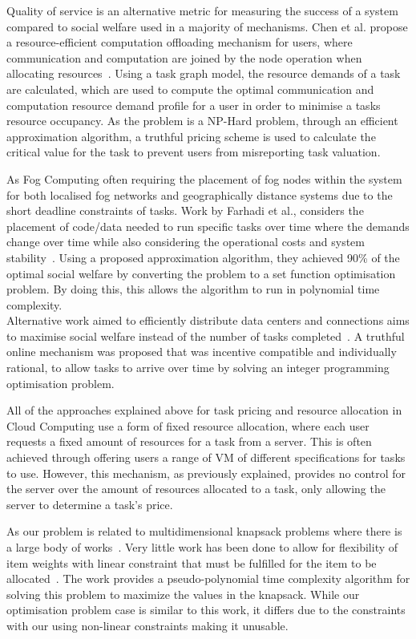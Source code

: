 Quality of service is an alternative metric for measuring the success of a system compared to social welfare used in a
majority of mechanisms. Chen et al. propose a resource-efficient computation offloading mechanism for users, where
communication and computation are joined by the node operation when allocating resources~\cite{8379445}. Using a task
graph model, the resource demands of a task are calculated, which are used to compute the optimal communication and
computation resource demand profile for a user in order to minimise a tasks resource occupancy. As the problem is a
NP-Hard problem, through an efficient approximation algorithm, a truthful pricing scheme is used to calculate the
critical value for the task to prevent users from misreporting task valuation.

As Fog Computing often requiring the placement of fog nodes within the system for both localised fog networks and
geographically distance systems due to the short deadline constraints of tasks. Work by Farhadi et al., considers
the placement of code/data needed to run specific tasks over time where the demands change over time while also
considering the operational costs and system stability~\cite{vaji_infocom}. Using a proposed approximation algorithm,
they achieved 90\% of the optimal social welfare by converting the problem to a set function optimisation problem. By
doing this, this allows the algorithm to run in polynomial time complexity. \\
Alternative work aimed to efficiently distribute data centers and connections aims to maximise social
welfare instead of the number of tasks completed~\cite{Bi2019}. A truthful online mechanism was proposed that was
incentive compatible and individually rational, to allow tasks to arrive over time by solving an integer programming
optimisation problem.

All of the approaches explained above for task pricing and resource allocation in Cloud Computing use a form of fixed
resource allocation, where each user requests a fixed amount of resources for a task from a server. This is often
achieved through offering users a range of VM of different specifications for tasks to use. However, this mechanism,
as previously explained, provides no control for the server over the amount of resources allocated to a task, only
allowing the server to determine a task's price.

As our problem is related to multidimensional knapsack problems where there is a large body of
works~\cite{knapsacks, numbers}. Very little work has been done to allow for flexibility of item weights with linear
constraint that must be fulfilled for the item to be allocated~\cite{Nip2017}. The work provides a pseudo-polynomial
time complexity algorithm for solving this problem to maximize the values in the knapsack. While our optimisation
problem case is similar to this work, it differs due to the constraints with our using non-linear constraints making
it unusable.
